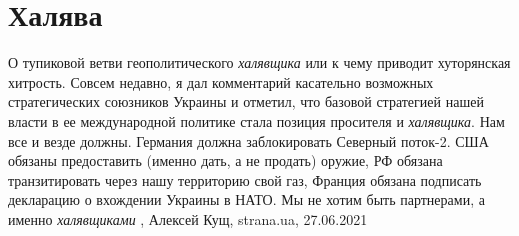  
 
 
 
 
\chapter{Халява}

О тупиковой ветви геополитического \emph{халявщика} или к чему приводит хуторянская
хитрость.  Совсем недавно, я дал комментарий касательно возможных
стратегических союзников Украины и отметил, что базовой стратегией нашей власти
в ее международной политике стала позиция просителя и \emph{халявщика}.  Нам все и
везде должны.  Германия должна заблокировать Северный поток-2. США обязаны
предоставить (именно дать, а не продать) оружие, РФ обязана транзитировать
через нашу территорию свой газ, Франция обязана подписать декларацию о
вхождении Украины в НАТО.  Мы не хотим быть партнерами, а именно \emph{халявщиками}
, 
Алексей Кущ, strana.ua, 27.06.2021

